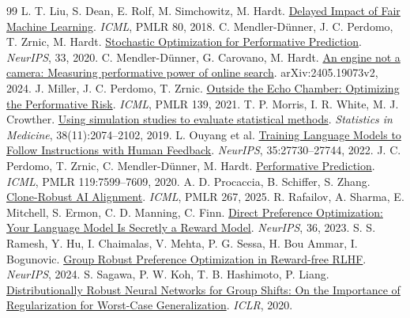 {\begin{thebibliography}{99}
 L. T. Liu, S. Dean, E. Rolf, M. Simchowitz, M. Hardt. \href{https://proceedings.mlr.press/v80/liu18c.html}{Delayed Impact of Fair Machine Learning}. \emph{ICML}, PMLR 80, 2018.
 C. Mendler-D\"unner, J. C. Perdomo, T. Zrnic, M. Hardt. \href{https://proceedings.neurips.cc/paper/2020/file/33e75ff09dd601bbe69f351039152189-Paper.pdf}{Stochastic Optimization for Performative Prediction}. \emph{NeurIPS}, 33, 2020.
 C. Mendler-D\"unner, G. Carovano, M. Hardt. \href{https://arxiv.org/abs/2405.19073v2}{An engine not a camera: Measuring performative power of online search}. arXiv:2405.19073v2, 2024.
 J. Miller, J. C. Perdomo, T. Zrnic. \href{https://proceedings.mlr.press/v139/miller21a.html}{Outside the Echo Chamber: Optimizing the Performative Risk}. \emph{ICML}, PMLR 139, 2021.
 T. P. Morris, I. R. White, M. J. Crowther. \href{https://doi.org/10.1002/sim.8086}{Using simulation studies to evaluate statistical methods}. \emph{Statistics in Medicine}, 38(11):2074--2102, 2019.
 L. Ouyang et al. \href{https://arxiv.org/abs/2203.02155}{Training Language Models to Follow Instructions with Human Feedback}. \emph{NeurIPS}, 35:27730--27744, 2022.
 J. C. Perdomo, T. Zrnic, C. Mendler-D\"unner, M. Hardt. \href{https://proceedings.mlr.press/v119/perdomo20a.html}{Performative Prediction}. \emph{ICML}, PMLR 119:7599--7609, 2020.
 A. D. Procaccia, B. Schiffer, S. Zhang. \href{https://proceedings.mlr.press/v267/procaccia25a.html}{Clone-Robust AI Alignment}. \emph{ICML}, PMLR 267, 2025.
 R. Rafailov, A. Sharma, E. Mitchell, S. Ermon, C. D. Manning, C. Finn. \href{https://arxiv.org/abs/2305.18290}{Direct Preference Optimization: Your Language Model Is Secretly a Reward Model}. \emph{NeurIPS}, 36, 2023.
 S. S. Ramesh, Y. Hu, I. Chaimalas, V. Mehta, P. G. Sessa, H. Bou Ammar, I. Bogunovic. \href{https://proceedings.neurips.cc/paper_files/paper/2024/file/762b012aad39c011ff5606dcc8e140f8-Paper-Conference.pdf}{Group Robust Preference Optimization in Reward-free RLHF}. \emph{NeurIPS}, 2024.
 S. Sagawa, P. W. Koh, T. B. Hashimoto, P. Liang. \href{https://arxiv.org/abs/1911.08731}{Distributionally Robust Neural Networks for Group Shifts: On the Importance of Regularization for Worst-Case Generalization}. \emph{ICLR}, 2020.

\end{thebibliography}}
